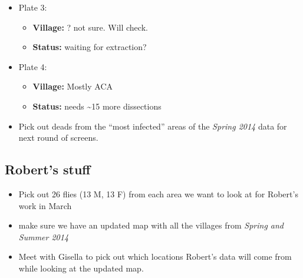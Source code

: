 \documentclass[letterpaper]{scrartcl}
\begin{document}
\begin{itemize}
\itemsep1pt\parskip0pt
\item
  Plate 3:

  \begin{itemize}
  \itemsep1pt\parskip0pt
  \item
    \textbf{Village:} ? not sure. Will check.
  \item
    \textbf{Status:} waiting for extraction?
  \end{itemize}
\item
  Plate 4:

  \begin{itemize}
  \itemsep1pt\parskip0pt
  \item
    \textbf{Village:} Mostly ACA
  \item
    \textbf{Status:} needs \textasciitilde{}15 more dissections
  \end{itemize}
\item
  Pick out deads from the ``most infected'' areas of the \emph{Spring
  2014} data for next round of screens.
\end{itemize}

\subsection{Robert's stuff}\label{roberts-stuff}

\begin{itemize}
\itemsep1pt\parskip0pt
\item
  Pick out 26 flies (13 M, 13 F) from each area we want to look at for
  Robert's work in March
\item
  make sure we have an updated map with all the villages from
  \emph{Spring and Summer 2014}
\item
  Meet with Gisella to pick out which locations Robert's data will come
  from while looking at the updated map.
\end{itemize}
\end{document}

